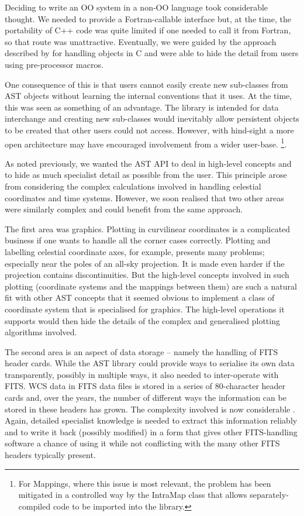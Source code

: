 \documentclass[final,authoryear,5p,times,twocolumn]{elsarticle}
\begin{document}
Deciding to write an OO system in a non-OO language took considerable
thought. We needed to provide a Fortran-callable interface but, at the
time, the portability of C++ code was quite limited if one needed to
call it from Fortran, so that route was unattractive. Eventually, we
were guided by the approach described by \citet{1992Holub} for
handling objects in C and were able to hide the detail from users
using pre-processor macros.

One consequence of this is that users cannot easily create new
sub-classes from AST objects without learning the internal conventions
that it uses. At the time, this was seen as something of an advantage.
The library is intended for data interchange and creating new
sub-classes would inevitably allow persistent objects to be created
that other users could not access. However, with hind-sight a more open
architecture may have encouraged involvement from a wider user-base.
\footnote{For Mappings, where this
  issue is most relevant, the problem has been mitigated in a
  controlled way by the IntraMap class that allows separately-compiled
  code to be imported into the library.}.

As noted previously, we wanted the AST API to deal in high-level
concepts and to hide as much specialist detail as possible from the
user. This principle arose from considering the complex calculations
involved in handling celestial coordinates and time systems. However,
we soon realised that two other areas were similarly complex and could
benefit from the same approach.

The first area was graphics. Plotting in curvilinear coordinates is a
complicated business if one wants to handle all the corner cases
correctly. Plotting and labelling celestial coordinate axes, for
example, presents many problems; especially near the poles of an all-sky
projection. It is made even harder if the projection contains
discontinuities. But the high-level concepts involved in such plotting
(coordinate systems and the mappings between them) are such a natural
fit with other AST concepts that it seemed obvious to implement a class
of coordinate system that is specialised for graphics. The high-level
operations it supports would then hide the details of the complex and
generalised plotting algorithms involved.

The second area is an aspect of data storage -- namely the handling of
FITS header cards. While the AST library could provide ways to
serialise its own data transparently, possibly in multiple ways, it
also needed to inter-operate with FITS. WCS data in FITS data files is
stored in a series of 80-character header cards and, over the years,
the number of different ways the information can be stored in these
headers has grown. The complexity involved is now considerable
\citep[see e.g.,][]{2015Thomas}. Again, detailed specialist knowledge
is needed to extract this information reliably and to write it back
(possibly modified) in a form that gives other FITS-handling software
a chance of using it while not conflicting with the many other FITS
headers typically present.
\end{document}
